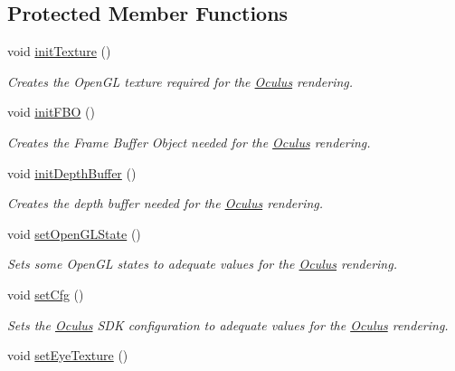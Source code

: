 \subsection*{Protected Member Functions}
\begin{DoxyCompactItemize}
\item 
void \hyperlink{classOculus_a8c20ccdb5b05a138bf7ec4e5efd0c890}{init\+Texture} ()
\begin{DoxyCompactList}\small\item\em Creates the Open\+G\+L texture required for the \hyperlink{classOculus}{Oculus} rendering. \end{DoxyCompactList}\item 
void \hyperlink{classOculus_ae48819d5aca05cf175bbc78327d512cf}{init\+F\+B\+O} ()
\begin{DoxyCompactList}\small\item\em Creates the Frame Buffer Object needed for the \hyperlink{classOculus}{Oculus} rendering. \end{DoxyCompactList}\item 
\hypertarget{classOculus_a774504de4fd7d8b6304d4a1ca7471d28}{}void \hyperlink{classOculus_a774504de4fd7d8b6304d4a1ca7471d28}{init\+Depth\+Buffer} ()\label{classOculus_a774504de4fd7d8b6304d4a1ca7471d28}

\begin{DoxyCompactList}\small\item\em Creates the depth buffer needed for the \hyperlink{classOculus}{Oculus} rendering. \end{DoxyCompactList}\item 
void \hyperlink{classOculus_ae5337c60b8b89c50cfc0ce90d6db2d8f}{set\+Open\+G\+L\+State} ()
\begin{DoxyCompactList}\small\item\em Sets some Open\+G\+L states to adequate values for the \hyperlink{classOculus}{Oculus} rendering. \end{DoxyCompactList}\item 
void \hyperlink{classOculus_add30e49061a9ec8a5676f9be24e8eec7}{set\+Cfg} ()
\begin{DoxyCompactList}\small\item\em Sets the \hyperlink{classOculus}{Oculus} S\+D\+K configuration to adequate values for the \hyperlink{classOculus}{Oculus} rendering. \end{DoxyCompactList}\item 
\hypertarget{classOculus_a5e1def14eace52ef4f62c263888c5fd2}{}void \hyperlink{classOculus_a5e1def14eace52ef4f62c263888c5fd2}{set\+Eye\+Texture} ()\label{classOculus_a5e1def14eace52ef4f62c263888c5fd2}


\end{DoxyCompactItemize}
